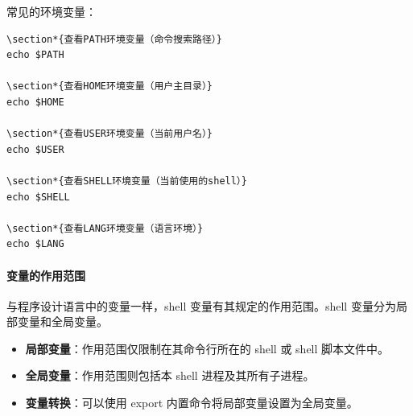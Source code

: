 \documentclass[12pt,UTF8]{ctexbook}
\begin{document}
常见的环境变量：
\begin{verbatim}
\section*{查看PATH环境变量（命令搜索路径）}
echo $PATH

\section*{查看HOME环境变量（用户主目录）}
echo $HOME

\section*{查看USER环境变量（当前用户名）}
echo $USER

\section*{查看SHELL环境变量（当前使用的shell）}
echo $SHELL

\section*{查看LANG环境变量（语言环境）}
echo $LANG
\end{verbatim}

\paragraph{变量的作用范围}
与程序设计语言中的变量一样，shell 变量有其规定的作用范围。shell 变量分为局部变量和全局变量。

\begin{itemize}
    \item \textbf{局部变量}：作用范围仅限制在其命令行所在的 shell 或 shell 脚本文件中。
    \item \textbf{全局变量}：作用范围则包括本 shell 进程及其所有子进程。
    \item \textbf{变量转换}：可以使用 export 内置命令将局部变量设置为全局变量。
\end{itemize}
\end{document}
